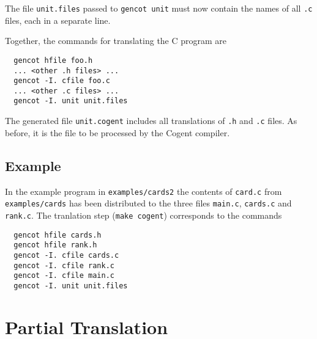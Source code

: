 \documentclass[a4paper]{report}
\newcommand{\code}[1]{\textnormal{\texttt{#1}}}
\begin{document}
The file \code{unit.files} passed to \code{gencot unit} must now contain the names of all \code{.c} files, each in a 
separate line.

Together, the commands for translating the C program are
\begin{verbatim}
  gencot hfile foo.h
  ... <other .h files> ...
  gencot -I. cfile foo.c
  ... <other .c files> ...
  gencot -I. unit unit.files
\end{verbatim}
The generated file \code{unit.cogent} includes all translations of \code{.h} and \code{.c} files. As before, it is the 
file to be processed by the Cogent compiler.

\subsection{Example}

In the example program in \code{examples/cards2} the contents of \code{card.c} from \code{examples/cards} has been 
distributed to the three files \code{main.c}, \code{cards.c} and \code{rank.c}.
The tranlation step (\code{make cogent}) corresponds to the commands
\begin{verbatim}
  gencot hfile cards.h
  gencot hfile rank.h
  gencot -I. cfile cards.c
  gencot -I. cfile rank.c
  gencot -I. cfile main.c
  gencot -I. unit unit.files
\end{verbatim}


\section{Partial Translation}
\label{simple-partial}
\end{document}
